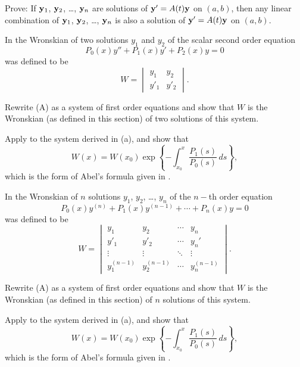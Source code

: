 \begin{exerciselist}
\item\label{exer:10.3.1}Prove: If $\mathbf{y}_1$, $\mathbf{y}_2$, \dots, $\mathbf{y}_n$ are solutions of
$\mathbf{y}'=A(t)\mathbf{y}$ on  $(a,b)$, then any linear
combination of $\mathbf{y}_1$, $\mathbf{y}_2$, \dots, $\mathbf{y}_n$ is also a
solution of $\mathbf{y}'=A(t)\mathbf{y}$ on $(a,b)$.

\item\label{exer:10.3.2}In  the Wronskian of two
solutions $y_1$ and $y_2$ of the scalar second order equation
\[
P_0(x)y''+P_1(x)y'+P_2(x)y=0
\tag{A}
\]
was defined to be
\[
W=\begin{vmatrix} y_1&y_2 \\ y'_1&y'_2\end{vmatrix}.
\]
\begin{alist}
\item %
Rewrite  (A)   as a system of first order equations and show
that $W$ is
the Wronskian (as defined in this section) of two solutions of this system.
\item %
Apply  to the system  derived in (a), and
show that
\[
W(x)=W(x_0)\exp\left\{-\int^x_{x_0}\frac{P_1(s)}{P_0(s)}\,
ds\right\},
\]
which is the form of Abel's formula given in
.
\end{alist}


\item\label{exer:10.3.3}In  the Wronskian of $n$
solutions $y_1$, $y_2$, \dots, $y_n$  of the $n-$th order
equation
\[
P_0(x)y^{(n)}+P_1(x)y^{(n-1)}+\cdots+P_n(x)y=0
\tag{A}
\]
was defined to be
\[
W=\begin{vmatrix}
y_1&y_2&\cdots&y_n \\
y'_1&y'_2&\cdots&y_n'\\
\vdots&\vdots&\ddots&\vdots\\
y_1^{(n-1)}&y_2^{(n-1)}&\cdots&y_n^{(n-1)}
\end{vmatrix}.
\]
\begin{alist}
\item %
Rewrite (A) as a system of first order equations and
show that $W$ is the Wronskian (as defined in this section) of $n$
solutions of this system.
\item %
Apply  to the system  derived in (a), and
show that
\[
W(x)=W(x_0)\exp\left\{-\int^x_{x_0}\frac{P_1(s)}{P_0(s)}\,
ds\right\},
\]
which is the form of Abel's formula given in
.
\end{alist}





\end{exerciselist}
